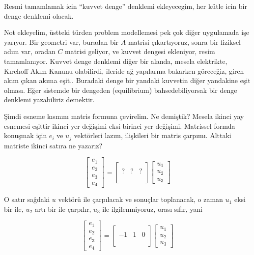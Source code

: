 \documentclass[12pt,fleqn]{article}\usepackage{../../common}
\begin{document}
Resmi tamamlamak icin ``kuvvet denge'' denklemi ekleyecegim, her kütle
icin bir denge denklemi olacak.

Not ekleyelim, üstteki türden problem modellemesi pek çok diğer uygulamada işe
yarıyor. Bir geometri var, buradan bir $A$ matrisi çıkartıyoruz, sonra bir
fiziksel adım var, oradan $C$ matrisi geliyor, ve kuvvet dengesi ekleniyor,
resim tamamlanıyor. Kuvvet denge denklemi diğer bir alanda, mesela elektrikte,
Kırchoff Akım Kanunu olabilirdi, ileride ağ yapılarına bakarken göreceğiz, giren
akım çıkan akıma eşit.. Buradaki denge bir yandaki kuvvetin diğer yandakine eşit
olması. Eğer sistemde bir dengeden (equilibrium) bahsedebiliyorsak bir denge
denklemi yazabiliriz demektir.

Şimdi esneme kısmını matris formuna çevirelim. Ne demiştik? Mesela ikinci yay
esnemesi eşittir ikinci yer değişimi eksi birinci yer değişimi. Matrissel formda
konuşmak için $e_i$ ve $u_j$ vektörleri lazım, ilişkileri bir matris çarpımı.
Alttaki matriste ikinci satıra ne yazarız?

$$
\left[\begin{array}{c}
e_1 \\ e_2 \\ e_3 \\ e_4
\end{array}\right] =
\left[\begin{array}{cccc}
 & & \\ ? & ? & ? \\  & & \\  & & 
\end{array}\right]
\left[\begin{array}{c}
u_1 \\ u_2 \\ u_3 
\end{array}\right]
$$

O satır sağdaki $u$ vektörü ile çarpılacak ve sonuçlar toplanacak, o zaman $u_1$
eksi bir ile, $u_2$ artı bir ile çarpılır, $u_3$ ile ilgilenmiyoruz, orası
sıfır, yani

$$
\left[\begin{array}{c}
e_1 \\ e_2 \\ e_3 \\ e_4
\end{array}\right] =
\left[\begin{array}{cccc}
 & & \\ -1 & 1 & 0 \\  & & \\  & & 
\end{array}\right]
\left[\begin{array}{c}
u_1 \\ u_2 \\ u_3 
\end{array}\right]
$$
\end{document}
